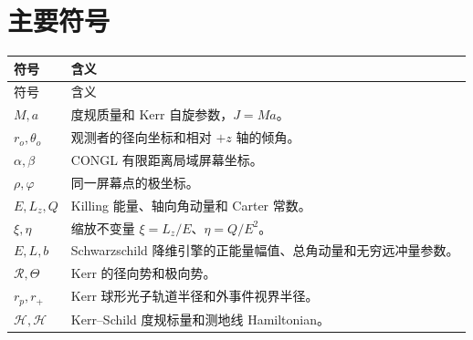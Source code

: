 \documentclass[UTF8,11pt,a4paper,fontset=fandol]{ctexart}
\newcommand{\Rpot}{\mathcal R}
\newcommand{\Tpot}{\Theta}
\newcommand{\Ham}{\mathcal H}
\begin{document}
\section{主要符号}

\begin{longtable}{>{\raggedright\arraybackslash}p{}>{\raggedright\arraybackslash}p{}}
\toprule
符号 & 含义\\
\midrule
\endfirsthead
\toprule
符号 & 含义\\
\midrule
\endhead
\(M,a\) & 度规质量和 Kerr 自旋参数，\(J=Ma\)。\\
\(r_o,\theta_o\) & 观测者的径向坐标和相对 \(+z\) 轴的倾角。\\
\(\alpha,\beta\) & CONGL 有限距离局域屏幕坐标。\\
\(\rho,\varphi\) & 同一屏幕点的极坐标。\\
\(E,L_z,Q\) & Killing 能量、轴向角动量和 Carter 常数。\\
\(\xi,\eta\) & 缩放不变量 \(\xi=L_z/E\)、\(\eta=Q/E^2\)。\\
\(E,L,b\) & Schwarzschild 降维引擎的正能量幅值、总角动量和无穷远冲量参数。\\
\(\Rpot,\Tpot\) & Kerr 的径向势和极向势。\\
\(r_p,r_+\) & Kerr 球形光子轨道半径和外事件视界半径。\\
\(\mathcal{H},\Ham\) & Kerr--Schild 度规标量和测地线 Hamiltonian。\\
\bottomrule
\end{longtable}
\end{document}
